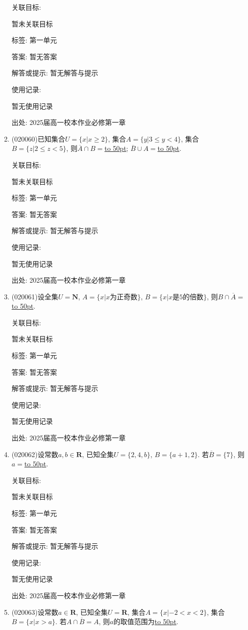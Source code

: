 \documentclass[10pt,a4paper]{article}
\newcommand{\blank}[1]{\underline{\hbox to #1pt{}}}
\begin{document}
\begin{enumerate}[1.]
关联目标:

暂未关联目标



标签: 第一单元

答案: 暂无答案

解答或提示: 暂无解答与提示

使用记录:

暂无使用记录


出处: 2025届高一校本作业必修第一章
\item { (020060)}已知集合$U=\{x|x\ge 2\}$, 集合$A=\{y|3\le y<4\}$, 集合$B=\{z|2\le z<5\}$, 则$\overline A\cap B=$\blank{50}; $\overline B\cup A=$\blank{50}.


关联目标:

暂未关联目标



标签: 第一单元

答案: 暂无答案

解答或提示: 暂无解答与提示

使用记录:

暂无使用记录


出处: 2025届高一校本作业必修第一章
\item { (020061)}设全集$U=\mathbf{N}$, $A=\{x|x\text{为正奇数}\}$, $B=\{x|x\text{是}5\text{的倍数}\}$, 则$B\cap\overline A=$\blank{50}.


关联目标:

暂未关联目标



标签: 第一单元

答案: 暂无答案

解答或提示: 暂无解答与提示

使用记录:

暂无使用记录


出处: 2025届高一校本作业必修第一章
\item { (020062)}设常数$a,b\in \mathbf{R}$, 已知全集$U=\{2, 4, b\}$, $B=\{a+1, 2\}$.  若$\overline B=\{7\}$, 则$a=$\blank{50}.


关联目标:

暂未关联目标



标签: 第一单元

答案: 暂无答案

解答或提示: 暂无解答与提示

使用记录:

暂无使用记录


出处: 2025届高一校本作业必修第一章
\item { (020063)}设常数$a\in \mathbf{R}$, 已知全集$U=\mathbf{R}$, 集合$A=\{x|-2<x<2\}$, 集合$B=\{x|x>a\}$. 若$A\cap\overline B=A$, 则$a$的取值范围为\blank{50}.



\end{enumerate}
\end{document}
